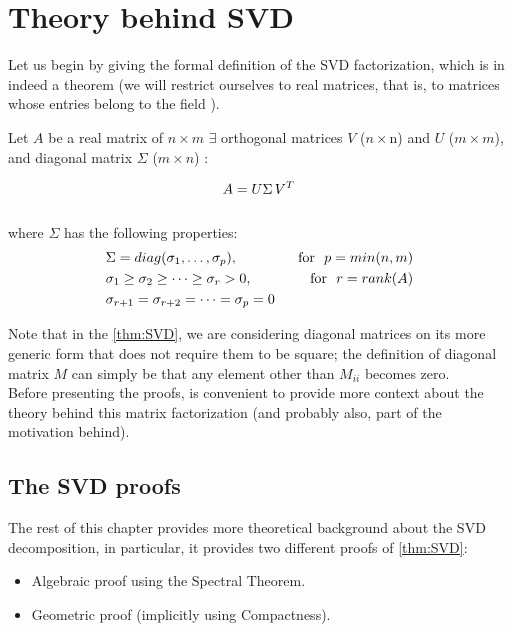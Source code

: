 \chapter{Theory behind SVD}
\label{cha:svd-theory}

Let us begin by giving the formal definition of the SVD factorization,
which is in indeed a theorem (we will restrict ourselves to real
matrices, that is, to matrices whose entries belong to the field
\R{}). \\

\begin{theorem}
\label{thm:SVD}
Let $A$ be a real matrix of $n \times m$ \imply $\exists$ orthogonal matrices
$V$ ($n \times $n) and $U$  ($m \times m$), and diagonal matrix
$\Sigma$ ($m \times n$) \suchthat:

\[
A = U \Sigma \,{V}^{T}\, 
\]
\\
where $\Sigma$ has the following properties: 
\begin{align*}
 & \Sigma =  diag(\sigma_1,\dots,\sigma_p), & \,\,\,\,\text{for}\,\,\,\, p = min(n,m)  \\
 & \sigma_1 \ge \sigma_2 \ge \dots \ge \sigma_r > 0, & \,\,\,\,\text{for}\,\,\,\, r = rank(A) \\
 & \sigma_{r+1} = \sigma_{r+2} = \dots = \sigma_p = 0 &
\end{align*}
\end{theorem}
\hfill

Note that in the \cref{thm:SVD}, we are considering diagonal
matrices on its more generic form that does not require them to be
square; the definition of diagonal matrix $M$ can simply be that any
element other than $M_{ii}$ becomes zero. \\

Before presenting the proofs, is convenient to provide more context
about the theory behind this matrix factorization (and probably also,
part of the motivation behind). \\



\section{The SVD proofs}
The rest of this chapter provides more theoretical background about
the SVD decomposition, in particular, it provides two different proofs of
\cref{thm:SVD}:

\begin{itemize}
  \item Algebraic proof using the Spectral Theorem.
  \item Geometric proof (implicitly using Compactness).
\end{itemize}
\hfill

